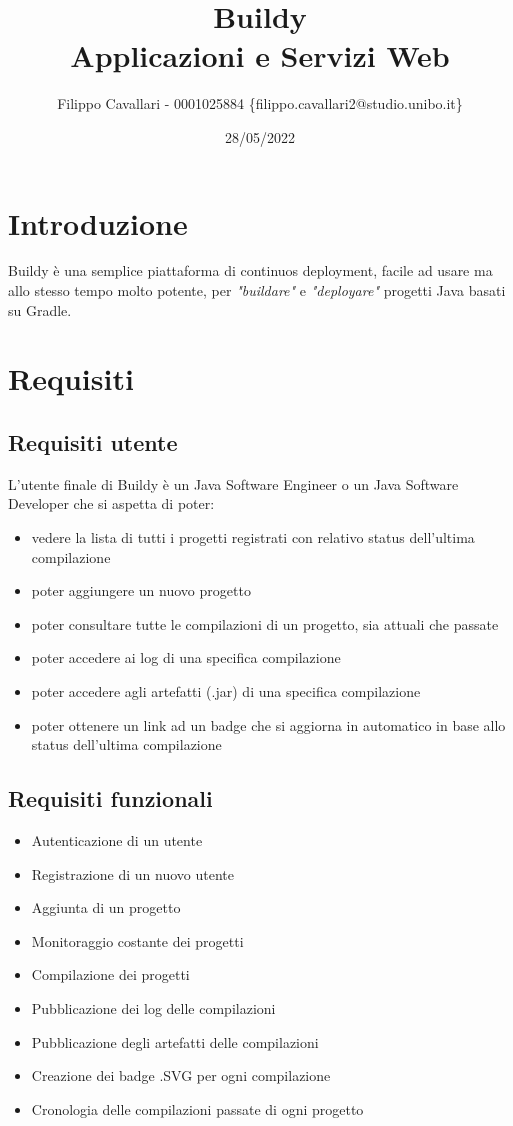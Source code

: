 \documentclass{report}
\title{
    Buildy \\
    \large Applicazioni e Servizi Web
}
\author{Filippo Cavallari - 0001025884 \{filippo.cavallari2@studio.unibo.it\}}
\date{28/05/2022}
\begin{document}
\maketitle
\section{Introduzione}
Buildy è una semplice piattaforma di continuos deployment, facile ad usare ma allo stesso tempo molto potente, per \textit{"buildare"} e \textit{"deployare"} progetti Java basati su Gradle.

\section{Requisiti}
\subsection{Requisiti utente}
L'utente finale di Buildy è un Java Software Engineer o un Java Software Developer che si aspetta di poter:
\begin{itemize}
\item vedere la lista di tutti i progetti registrati con relativo status dell'ultima compilazione
\item poter aggiungere un nuovo progetto
\item poter consultare tutte le compilazioni di un progetto, sia attuali che passate
\item poter accedere ai log di una specifica compilazione
\item poter accedere agli artefatti (.jar) di una specifica compilazione
\item poter ottenere un link ad un badge che si aggiorna in automatico in base allo status dell'ultima compilazione
\end{itemize}

\subsection{Requisiti funzionali}
\begin{itemize}
\item Autenticazione di un utente
\item Registrazione di un nuovo utente
\item Aggiunta di un progetto
\item Monitoraggio costante dei progetti
\item Compilazione dei progetti
\item Pubblicazione dei log delle compilazioni
\item Pubblicazione degli artefatti delle compilazioni
\item Creazione dei badge .SVG per ogni compilazione
\item Cronologia delle compilazioni passate di ogni progetto
\end{itemize}
\end{document}
